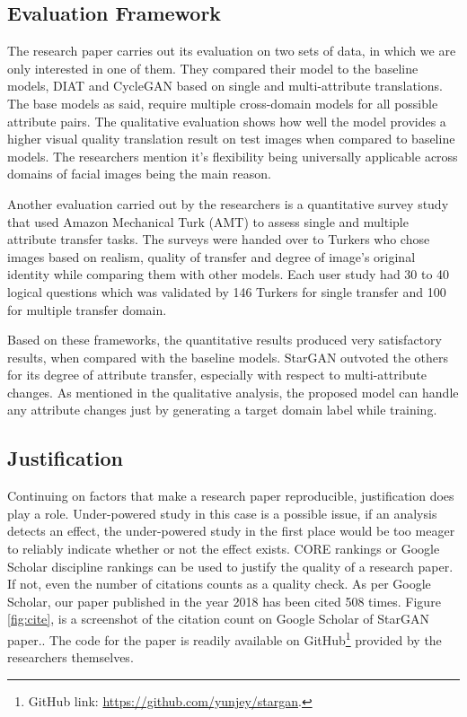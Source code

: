 \documentclass[preprint,12pt]{elsarticle}
\begin{document}
\subsection{Evaluation Framework}

The research paper carries out its evaluation on two sets of data, in which we are only interested in one of them. They compared their model to the baseline models, DIAT and CycleGAN based on single and multi-attribute translations. The base models as said, require multiple cross-domain models for all possible attribute pairs. The qualitative evaluation shows how well the model provides a higher visual quality translation result on test images when compared to baseline models. The researchers mention it's flexibility being universally applicable across domains of facial images being the main reason.

Another evaluation carried out by the researchers is a quantitative survey study that used Amazon Mechanical Turk (AMT) to assess single and multiple attribute transfer tasks. The surveys were handed over to Turkers who chose images based on realism, quality of transfer and degree of image's original identity while comparing them with other models. Each user study had 30 to 40 logical questions which was validated by 146 Turkers for single transfer and 100 for multiple transfer domain.

Based on these frameworks, the quantitative results produced very satisfactory results,  when compared with the baseline models. StarGAN outvoted the others for its degree of attribute transfer, especially with respect to multi-attribute changes. As mentioned in the qualitative analysis, the proposed model can handle any attribute changes just by generating a target domain label while training. 

\subsection{Justification}

Continuing on factors that make a research paper reproducible, justification does play a role. Under-powered study in this case is a possible issue, if an analysis detects an effect, the under-powered study in the first place would be too meager to reliably indicate whether or not the effect exists. CORE rankings or Google Scholar discipline rankings can be used to justify the quality of a research paper. If not, even the number of citations counts as a quality check. As per Google Scholar, our paper published in the year 2018 has been cited 508 times. Figure \ref{fig:cite}, is a screenshot of the citation count on Google Scholar of StarGAN paper.\cite{StarGAN2018}. The code for the paper is readily available on GitHub\footnote{GitHub link: \url{https://github.com/yunjey/stargan}.} provided by the researchers themselves. 
\end{document}

